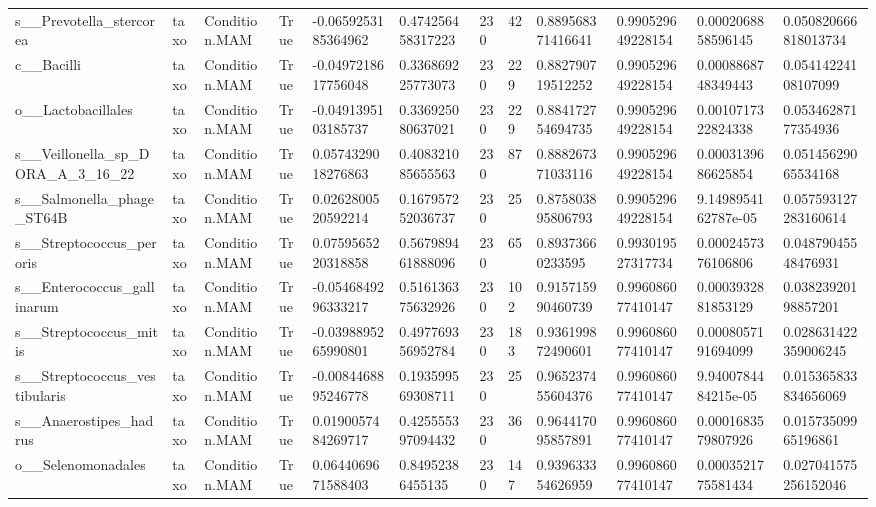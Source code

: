 \begin{longtable}{llllllllllll}
s\_\_Prevotella\_stercorea & taxo & Condition.MAM & True & -0.0659253185364962 & 0.474256458317223 & 230 & 42 & 0.889568371416641 & 0.990529649228154 & 0.0002068858596145 & 0.050820666818013734 \\
c\_\_Bacilli & taxo & Condition.MAM & True & -0.0497218617756048 & 0.336869225773073 & 230 & 229 & 0.882790719512252 & 0.990529649228154 & 0.0008868748349443 & 0.05414224108107099 \\
o\_\_Lactobacillales & taxo & Condition.MAM & True & -0.0491395103185737 & 0.336925080637021 & 230 & 229 & 0.884172754694735 & 0.990529649228154 & 0.0010717322824338 & 0.05346287177354936 \\
s\_\_Veillonella\_sp\_DORA\_A\_3\_16\_22 & taxo & Condition.MAM & True & 0.0574329018276863 & 0.408321085655563 & 230 & 87 & 0.888267371033116 & 0.990529649228154 & 0.0003139686625854 & 0.05145629065534168 \\
s\_\_Salmonella\_phage\_ST64B & taxo & Condition.MAM & True & 0.0262800520592214 & 0.167957252036737 & 230 & 25 & 0.875803895806793 & 0.990529649228154 & 9.1498954162787e-05 & 0.057593127283160614 \\
s\_\_Streptococcus\_peroris & taxo & Condition.MAM & True & 0.0759565220318858 & 0.567989461888096 & 230 & 65 & 0.89373660233595 & 0.993019527317734 & 0.0002457376106806 & 0.04879045548476931 \\
s\_\_Enterococcus\_gallinarum & taxo & Condition.MAM & True & -0.0546849296333217 & 0.516136375632926 & 230 & 102 & 0.915715990460739 & 0.996086077410147 & 0.0003932881853129 & 0.03823920198857201 \\
s\_\_Streptococcus\_mitis & taxo & Condition.MAM & True & -0.0398895265990801 & 0.497769356952784 & 230 & 183 & 0.936199872490601 & 0.996086077410147 & 0.0008057191694099 & 0.028631422359006245 \\
s\_\_Streptococcus\_vestibularis & taxo & Condition.MAM & True & -0.0084468895246778 & 0.193599569308711 & 230 & 25 & 0.965237455604376 & 0.996086077410147 & 9.9400784484215e-05 & 0.015365833834656069 \\
s\_\_Anaerostipes\_hadrus & taxo & Condition.MAM & True & 0.0190057484269717 & 0.425555397094432 & 230 & 36 & 0.964417095857891 & 0.996086077410147 & 0.0001683579807926 & 0.01573509965196861 \\
o\_\_Selenomonadales & taxo & Condition.MAM & True & 0.0644069671588403 & 0.84952386455135 & 230 & 147 & 0.939633354626959 & 0.996086077410147 & 0.0003521775581434 & 0.027041575256152046 \\

\end{longtable}
